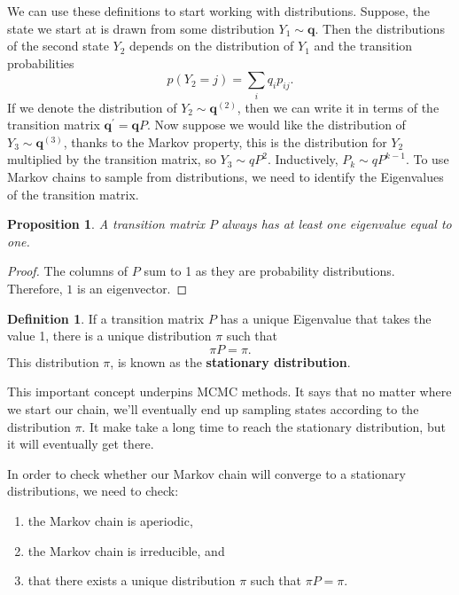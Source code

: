 \documentclass[
]{book}
\newtheorem{proposition}{Proposition}[chapter]
\theoremstyle{definition}
\newtheorem{definition}{Definition}[chapter]
\theoremstyle{definition}
\theoremstyle{definition}
\theoremstyle{definition}
\theoremstyle{remark}
\begin{document}
We can use these definitions to start working with distributions. Suppose, the state we start at is drawn from some distribution \(Y_1 \sim \boldsymbol{q}\). Then the distributions of the second state \(Y_2\) depends on the distribution of \(Y_1\) and the transition probabilities
\[
p(Y_2 = j) = \sum_i q_ip_{ij}.
\]
If we denote the distribution of \(Y_2 \sim \boldsymbol{q}^{(2)}\), then we can write it in terms of the transition matrix \(\boldsymbol{q}^\prime = \boldsymbol{q}P\). Now suppose we would like the distribution of \(Y_3 \sim \boldsymbol{q}^{(3)}\), thanks to the Markov property, this is the distribution for \(Y_2\) multiplied by the transition matrix, so \(Y_3 \sim qP^2\). Inductively, \(P_k \sim qP^{k-1}\). To use Markov chains to sample from distributions, we need to identify the Eigenvalues of the transition matrix.

\begin{proposition}
A transition matrix \(P\) always has at least one eigenvalue equal to one.
\end{proposition}

\begin{proof}
The columns of \(P\) sum to 1 as they are probability distributions. Therefore, \(1\) is an eigenvector.
\end{proof}

\begin{definition}
If a transition matrix \(P\) has a unique Eigenvalue that takes the value 1, there is a unique distribution \(\pi\) such that
\[
\pi P = \pi. 
\]
This distribution \(\pi\), is known as the \textbf{stationary distribution}.
\end{definition}

This important concept underpins MCMC methods. It says that no matter where we start our chain, we'll eventually end up sampling states according to the distribution \(\pi\). It make take a long time to reach the stationary distribution, but it will eventually get there.

In order to check whether our Markov chain will converge to a stationary distributions, we need to check:

\begin{enumerate}
\def\labelenumi{\arabic{enumi}.}
\item
  the Markov chain is aperiodic,
\item
  the Markov chain is irreducible, and
\item
  that there exists a unique distribution \(\pi\) such that \(\pi P = \pi\).
\end{enumerate}
\end{document}
